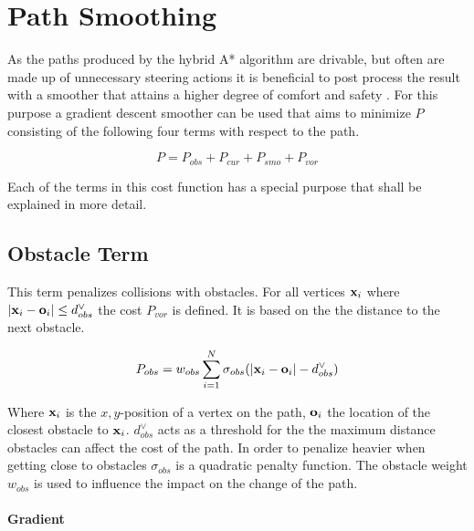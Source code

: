 \section{Path Smoothing}
As the paths produced by the hybrid A* algorithm are drivable, but often are made up of unnecessary steering actions it is beneficial to post process the result with a smoother that attains a higher degree of comfort and safety \cite{Dolgov.2008,Dolgov.2010}. For this purpose a gradient descent smoother can be used that aims to minimize $P$ consisting of the following four terms with respect to the path.

\begin{equation}
P = P_{obs} + P_{cur} + P_{smo} + P_{vor}
\end{equation}

Each of the terms in this cost function has a special purpose that shall be explained in more detail.

\subsection{Obstacle Term}

This term penalizes collisions with obstacles. For all vertices $\mathbf{x}_i$ where $|\mathbf{x}_i - \mathbf{o}_i| \leq d_{obs}^{\lor}$ the cost $P_{vor}$ is defined. It is based on the the distance to the next obstacle.


\begin{equation}
P_{obs} = w_{obs} \displaystyle\sum_{i=1}^{N} \sigma_{obs}(|\mathbf{x}_i-\mathbf{o}_i|-d_{obs}^{\lor})
\end{equation}

Where $\mathbf{x}_i$ is the $x,y$-position of a vertex on the path, $\mathbf{o}_i$ the location of the closest obstacle to $\mathbf{x}_i$. $d_{obs}^{\lor}$ acts as a threshold for the the maximum distance obstacles can affect the cost of the path. In order to penalize heavier when getting close to obstacles $\sigma_{obs}$ is a quadratic penalty function. The obstacle weight $w_{obs}$ is used to influence the impact on the change of the path.

\paragraph{Gradient}

